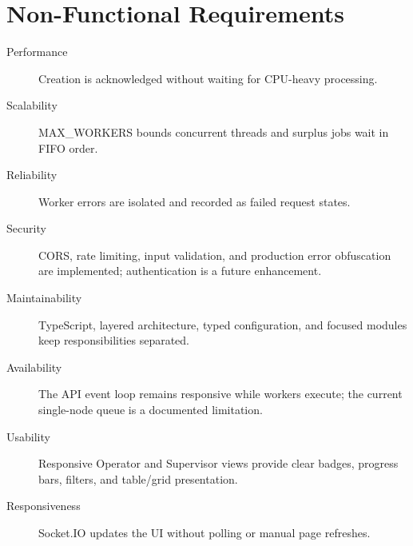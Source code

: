 \documentclass[11pt,a4paper]{article}
\begin{document}
\section{Non-Functional Requirements}
\begin{description}
\item[Performance] Creation is acknowledged without waiting for CPU-heavy processing.
\item[Scalability] MAX\_WORKERS bounds concurrent threads and surplus jobs wait in FIFO order.
\item[Reliability] Worker errors are isolated and recorded as failed request states.
\item[Security] CORS, rate limiting, input validation, and production error obfuscation are implemented; authentication is a future enhancement.
\item[Maintainability] TypeScript, layered architecture, typed configuration, and focused modules keep responsibilities separated.
\item[Availability] The API event loop remains responsive while workers execute; the current single-node queue is a documented limitation.
\item[Usability] Responsive Operator and Supervisor views provide clear badges, progress bars, filters, and table/grid presentation.
\item[Responsiveness] Socket.IO updates the UI without polling or manual page refreshes.
\end{description}
\end{document}
